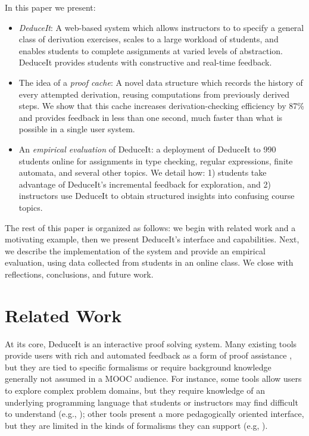 \documentclass{sigchi}
\begin{document}

In this paper we present:
\begin{itemize}
\item \textit{DeduceIt}: A web-based system which allows instructors to to specify a general class of derivation exercises, 
scales to a large workload of students, and enables students to complete assignments at varied levels of abstraction. DeduceIt provides students with constructive and real-time feedback.
\item The idea of a \textit{proof cache}: A novel data structure which records the history of every attempted derivation, reusing computations from previously derived steps. We show that this cache increases derivation-checking efficiency by 87\% and provides feedback in less than one second, much faster than what is possible in a single user system.
\item An \textit{empirical evaluation} of DeduceIt: a deployment of DeduceIt to 990 students online
for assignments in type checking, regular expressions, finite automata, and several other topics. We detail how: 1) students take advantage of DeduceIt's incremental feedback for exploration, and 2) instructors use DeduceIt to obtain structured insights into confusing course topics.
\end{itemize}

The rest of this paper is organized as follows: we begin with related work and a motivating example, then we present DeduceIt's interface and capabilities. Next, we describe the implementation of the system and provide an empirical evaluation, using data collected from students in an online class. We close with reflections, conclusions, and future work.

\section{Related Work}
At its core, DeduceIt is an interactive proof solving system. Many existing tools provide users with rich and automated feedback as a form of proof assistance \cite{coq,maude,isabelle, isabelle1,lisp-logic, burstall, its, theorema}, but they are tied to specific formalisms or require background knowledge generally not assumed in a MOOC audience. For instance, some tools allow users to explore  complex problem domains, but they require knowledge of an underlying programming language that students or instructors may find difficult to understand (e.g., \cite{coq,isabelle}); other tools present a more pedagogically oriented interface, but they are limited in the kinds of formalisms they can support (e.g, \cite{theorema}). 
\end{document}
